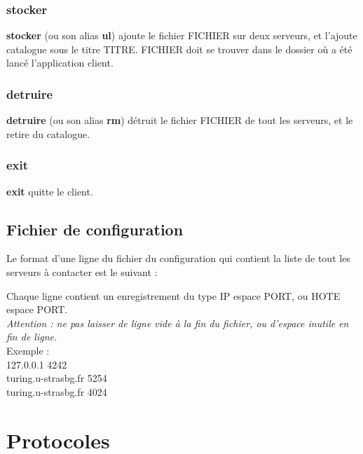 \documentclass[10pt,a4paper]{article}
\begin{document}
\subsubsection{stocker}
\begin{center}
\end{center}
\textbf{stocker} (ou son alias \textbf{ul}) ajoute le fichier FICHIER sur deux serveurs, et l'ajoute catalogue sous le titre TITRE. FICHIER doit se trouver dans le dossier où a été lancé l'application client.

\subsubsection{detruire}
\begin{center}
\end{center}
\textbf{detruire} (ou son alias \textbf{rm}) détruit le fichier FICHIER de tout les serveurs, et le retire du catalogue.

\subsubsection{exit}
\begin{center}
\end{center}
\textbf{exit} quitte le client.

\subsection{Fichier de configuration}

Le format d'une ligne du fichier du configuration qui contient la liste de tout les serveurs à contacter est le suivant :
\begin{center}
\end{center}
Chaque ligne contient un enregistrement du type IP espace PORT, ou HOTE espace PORT.\\
\textit{Attention : ne pas laisser de ligne vide à la fin du fichier, ou d'espace inutile en fin de ligne.}\\

Exemple :\\
127.0.0.1 4242\\
turing.u-strasbg.fr 5254\\
turing.u-strasbg.fr 4024\\
\newpage

\section{Protocoles}
\end{document}
